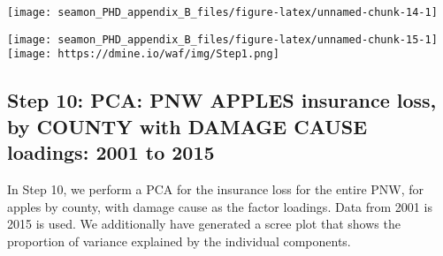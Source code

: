 \documentclass[]{article}
\newenvironment{Shaded}{\begin{snugshade}}{\end{snugshade}}
\newcommand{\CommentTok}[1]{\textcolor[rgb]{0.56,0.35,0.01}{\textit{#1}}}
\newcommand{\DataTypeTok}[1]{\textcolor[rgb]{0.13,0.29,0.53}{#1}}
\newcommand{\DecValTok}[1]{\textcolor[rgb]{0.00,0.00,0.81}{#1}}
\newcommand{\KeywordTok}[1]{\textcolor[rgb]{0.13,0.29,0.53}{\textbf{#1}}}
\newcommand{\NormalTok}[1]{#1}
\newcommand{\OperatorTok}[1]{\textcolor[rgb]{0.81,0.36,0.00}{\textbf{#1}}}
\newcommand{\StringTok}[1]{\textcolor[rgb]{0.31,0.60,0.02}{#1}}
\begin{document}
\texttt{[image: seamon\_PHD\_appendix\_B\_files/figure-latex/unnamed-chunk-14-1]}

\begin{Shaded}
\end{Shaded}

\texttt{[image: seamon\_PHD\_appendix\_B\_files/figure-latex/unnamed-chunk-15-1]}
\texttt{[image: https://dmine.io/waf/img/Step1.png]}

\hypertarget{step-10-pca-pnw-apples-insurance-loss-by-county-with-damage-cause-loadings-2001-to-2015}{%
\subsection{Step 10: PCA: PNW APPLES insurance loss, by COUNTY with
DAMAGE CAUSE loadings: 2001 to
2015}\label{step-10-pca-pnw-apples-insurance-loss-by-county-with-damage-cause-loadings-2001-to-2015}}

In Step 10, we perform a PCA for the insurance loss for the entire PNW,
for apples by county, with damage cause as the factor loadings. Data
from 2001 is 2015 is used. We additionally have generated a scree plot
that shows the proportion of variance explained by the individual
components.
\end{document}
